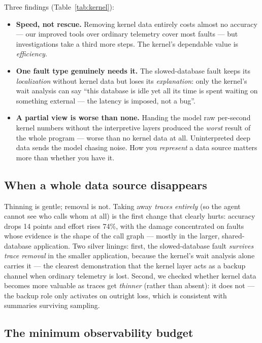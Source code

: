 Three findings (Table~\ref{tab:kernel}):
\begin{itemize}
  \item \textbf{Speed, not rescue.} Removing kernel data entirely costs almost no
  accuracy --- our improved tools over ordinary telemetry cover most faults --- but
  investigations take a third more steps. The kernel's dependable value is
  \emph{efficiency}.
  \item \textbf{One fault type genuinely needs it.} The slowed-database fault keeps
  its \emph{localization} without kernel data but loses its \emph{explanation}: only
  the kernel's wait analysis can say ``this database is idle yet all its time is
  spent waiting on something external --- the latency is imposed, not a bug''.
  \item \textbf{A partial view is worse than none.} Handing the model raw per-second
  kernel numbers without the interpretive layers produced the \emph{worst} result of
  the whole program --- worse than no kernel data at all. Uninterpreted deep data
  sends the model chasing noise. How you \emph{represent} a data source matters more
  than whether you have it.
\end{itemize}

\subsection{When a whole data source disappears}

Thinning is gentle; removal is not. Taking away \emph{traces entirely} (so the agent
cannot see who calls whom at all) is the first change that clearly hurts: accuracy
drops 14 points and effort rises 74\%, with the damage concentrated on faults whose
evidence is the shape of the call graph --- mostly in the larger, shared-database
application. Two silver linings: first, the slowed-database fault \emph{survives
trace removal} in the smaller application, because the kernel's wait analysis alone
carries it --- the clearest demonstration that the kernel layer acts as a backup
channel when ordinary telemetry is lost. Second, we checked whether kernel data
becomes more valuable as traces get \emph{thinner} (rather than absent): it does not
--- the backup role only activates on outright loss, which is consistent with
summaries surviving sampling.

\subsection{The minimum observability budget}

